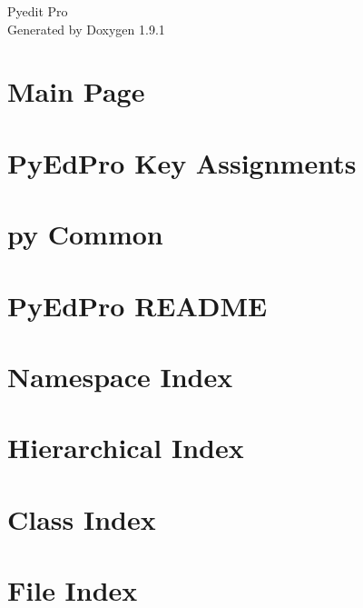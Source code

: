 \let\mypdfximage\pdfximage\def\pdfximage{\immediate\mypdfximage}\documentclass[twoside]{book}
\newcommand{\+}{\discretionary{\mbox{\scriptsize$\hookleftarrow$}}{}{}}
\newcommand{\clearemptydoublepage}{%
  \newpage{\pagestyle{empty}\cleardoublepage}%
}
\begin{document}
\raggedbottom

\hypersetup{pageanchor=false,
             bookmarksnumbered=true,
             pdfencoding=unicode
            }
\begin{titlepage}
\vspace*{7cm}
\begin{center}%
{\Large Pyedit Pro }\\
\vspace*{1cm}
{\large Generated by Doxygen 1.9.1}\\
\end{center}
\end{titlepage}
\clearemptydoublepage
{}
\tableofcontents
\clearemptydoublepage
{}
\hypersetup{pageanchor=true}

\chapter{Main Page}
\label{index}\hypertarget{index}{}
\chapter{Py\+Ed\+Pro Key Assignments}
\label{md_pyedpro_KEYMAP}

\chapter{py Common}
\label{md_pyedpro_pycommon_README}

\chapter{Py\+Ed\+Pro README}
\label{md_pyedpro_README}

\chapter{Namespace Index}

\chapter{Hierarchical Index}

\chapter{Class Index}

\chapter{File Index}

\end{document}
